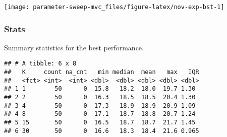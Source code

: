 \documentclass[]{book}
\newenvironment{Shaded}{\begin{snugshade}}{\end{snugshade}}
\newcommand{\DataTypeTok}[1]{\textcolor[rgb]{0.13,0.29,0.53}{#1}}
\newcommand{\KeywordTok}[1]{\textcolor[rgb]{0.13,0.29,0.53}{\textbf{#1}}}
\newcommand{\NormalTok}[1]{#1}
\newcommand{\OperatorTok}[1]{\textcolor[rgb]{0.81,0.36,0.00}{\textbf{#1}}}
\newcommand{\OtherTok}[1]{\textcolor[rgb]{0.56,0.35,0.01}{#1}}
\newcommand{\StringTok}[1]{\textcolor[rgb]{0.31,0.60,0.02}{#1}}
\begin{document}
\texttt{[image: parameter-sweep-mvc\_files/figure-latex/nov-exp-bst-1]}

\hypertarget{stats-50}{%
\subsubsection{Stats}\label{stats-50}}

Summary statistics for the best performance.

\begin{Shaded}
\end{Shaded}

\begin{verbatim}
## # A tibble: 6 x 8
##   K     count na_cnt   min median  mean   max   IQR
##   <fct> <int>  <int> <dbl>  <dbl> <dbl> <dbl> <dbl>
## 1 1        50      0  15.8   18.2  18.0  19.7 1.30 
## 2 2        50      0  16.3   18.5  18.5  20.4 1.30 
## 3 4        50      0  17.3   18.9  18.9  20.9 1.09 
## 4 8        50      0  17.1   18.7  18.8  20.7 1.24 
## 5 15       50      0  16.5   18.7  18.7  21.7 1.45 
## 6 30       50      0  16.6   18.3  18.4  21.6 0.965
\end{verbatim}
\end{document}
